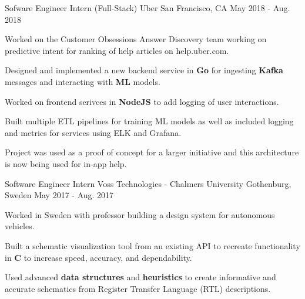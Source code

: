 

\begin{cventries}

  \cventry
    {Sofware Engineer Intern (Full-Stack)} %
    {Uber} %
    {San Francisco, CA} %
    {May 2018 - Aug. 2018} %
    {
      \begin{cvitems} %
        \item {Worked on the Customer Obsessions Answer Discovery team working on predictive intent for ranking of help articles on help.uber.com.}
        \item {Designed and implemented a new backend service in \textbf{Go} for ingesting \textbf{Kafka} messages and interacting with \textbf{ML} models.}
        \item {Worked on frontend serivces in \textbf{NodeJS} to add logging of user interactions.}
        \item {Built multiple ETL pipelines for training ML models as well as included logging and metrics for services using ELK and Grafana.}
        \item {Project was used as a proof of concept for a larger initiative and this architecture is now being used for in-app help.}
      \end{cvitems}
    }

  \cventry
    {Software Engineer Intern} %
    {Voss Technologies - Chalmers University} %
    {Gothenburg, Sweden} %
    {May 2017 - Aug. 2017} %
    {
      \begin{cvitems} %
        \item Worked in Sweden with professor building a design system for autonomous vehicles.
        \item Built a schematic visualization tool from an existing API to recreate functionality in \textbf{C} to increase speed, accuracy, and dependability. 
        \item Used advanced \textbf{data structures} and \textbf{heuristics} to create informative and accurate schematics from Register Transfer Language (RTL) descriptions.
      \end{cvitems}
    }


\end{cventries}
